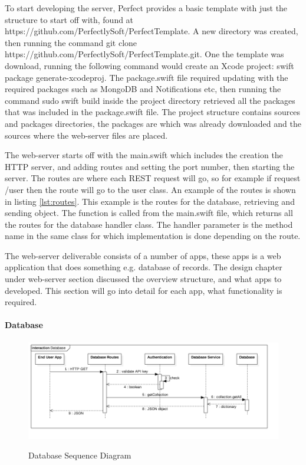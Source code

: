 To start developing the server, Perfect provides a basic template with just the structure to start off with, found at https://github.com/PerfectlySoft/PerfectTemplate. A new directory was created, then running the command git clone https://github.com/PerfectlySoft/PerfectTemplate.git. One the template was download, running the following command would create an Xcode project: swift package generate-xcodeproj. The package.swift file required updating with the required packages such as MongoDB and Notifications etc, then running the command sudo swift build inside the project directory retrieved all the packages that was included in the package.swift file. The project structure contains sources and packages directories, the packages are which was already downloaded and the sources where the web-server files are placed. 

The web-server starts off with the main.swift which includes the creation the HTTP server, and adding routes and setting the port number, then starting the server. The routes are where each REST request will go, so for example if request /user then the route will go to the user class. An example of the routes is shown in listing \ref{lst:routes}. This example is the routes for the database, retrieving and sending object. The function is called from the main.swift file, which returns all the routes for the database handler class. The handler parameter is the method name in the same class for which implementation is done depending on the route.



The web-server deliverable consists of a number of apps, these apps is a web application that does something e.g. database of records. The design chapter under web-server section discussed the overview structure, and what apps to developed. This section will go into detail for each app, what functionality is required.

\paragraph{Database}

\begin{figure}[!h]
    \caption{Database Sequence Diagram}
    \centering
    \includegraphics[width=150mm]{images/sequence/Database}
    \label{fig:database-seq}
\end{figure} 


